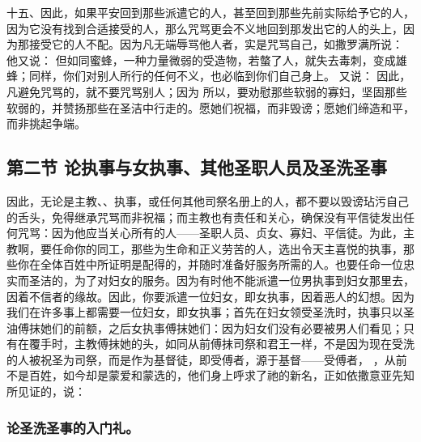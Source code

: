 十五、因此，如果平安回到那些派遣它的人，甚至回到那些先前实际给予它的人，因为它没有找到合适接受的人，那么咒骂更会不义地回到那发出它的人的头上，因为那接受它的人不配。因为凡无端辱骂他人者，实是咒骂自己，如撒罗满所说：  他又说：  但如同蜜蜂，一种力量微弱的受造物，若螫了人，就失去毒刺，变成雄蜂；同样，你们对别人所行的任何不义，也必临到你们自己身上。 又说：  因此，凡避免咒骂的，就不要咒骂别人；因为  所以，要劝慰那些软弱的寡妇，坚固那些软弱的，并赞扬那些在圣洁中行走的。愿她们祝福，而非毁谤；愿她们缔造和平，而非挑起争端。\par


\subsection{第二节  论执事与女执事、其他圣职人员及圣洗圣事}

因此，无论是主教、、执事，或任何其他司祭名册上的人，都不要以毁谤玷污自己的舌头，免得继承咒骂而非祝福；而主教也有责任和关心，确保没有平信徒发出任何咒骂：因为他应当关心所有的人——圣职人员、贞女、寡妇、平信徒。为此，主教啊，要任命你的同工，那些为生命和正义劳苦的人，选出令天主喜悦的执事，那些你在全体百姓中所证明是配得的，并随时准备好服务所需的人。也要任命一位忠实而圣洁的，为了对妇女的服务。因为有时他不能派遣一位男执事到妇女那里去，因着不信者的缘故。因此，你要派遣一位妇女，即女执事，因着恶人的幻想。因为我们在许多事上都需要一位妇女，即女执事；首先在妇女领受圣洗时，执事只以圣油傅抹她们的前额，之后女执事傅抹她们：因为妇女们没有必要被男人们看见；只有在覆手时，主教傅抹她的头，如同从前傅抹司祭和君王一样，不是因为现在受洗的人被祝圣为司祭，而是作为基督徒，即受傅者，源于基督——受傅者， ，从前不是百姓，如今却是蒙爱和蒙选的，他们身上呼求了祂的新名，正如依撒意亚先知所见证的，说：\par


\subsubsection{论圣洗圣事的入门礼。}

